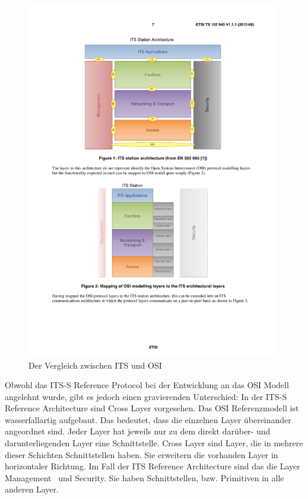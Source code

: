 \begin{figure}[h]
	\includegraphics[width=0.99\textwidth]{content/images/02_architektur/vergleichITS-OSI.pdf}
	\caption{Der Vergleich zwischen ITS und OSI \cite{ts102940}}
	\label{fig:architektur_vergleichItsOsi}
\end{figure}

Obwohl das \ac{ITS-S} Reference Protocol bei der Entwicklung an das \ac{OSI} Modell angelehnt wurde, gibt es jedoch einen gravierenden Unterschied: In der \ac{ITS-S} Reference Architecture sind Cross Layer vorgesehen. Das \ac{OSI} Referenzmodell ist wasserfallartig aufgebaut. Das bedeutet, dass die einzelnen Layer übereinander angeordnet sind. Jeder Layer hat jeweils nur zu dem direkt darüber- und darunterliegenden Layer eine Schnittstelle. Cross Layer sind Layer, die in mehrere dieser Schichten Schnittstellen haben. Sie erweitern die vorhanden Layer in horizontaler Richtung. Im Fall der \ac{ITS} Reference Architecture sind das die Layer \glqq Management\grqq~ und \glqq Security\grqq. Sie haben Schnittstellen, bzw. Primitiven in alle anderen Layer. 

